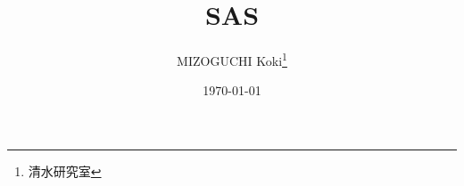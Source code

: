 \documentclass[aspectratio=43]{beamer}
\title{SAS}
\author[K.MIZOGUCHI]{MIZOGUCHI Koki\thanks{清水研究室}}
\date{\today}
\institute[KUT]{Kochi University of Technology}
\begin{document}
\begin{frame}
    \titlepage
\end{frame}

\end{document}
